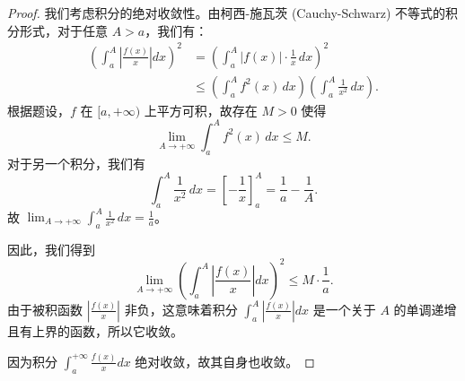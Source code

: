 \documentclass[lang=cn,10pt,thmcnt=section]{elegantbook}
\begin{document}
\begin{proof}
    我们考虑积分的绝对收敛性。由柯西-施瓦茨 (Cauchy-Schwarz) 不等式的积分形式，对于任意 $A > a$，我们有：
\begin{align*}
    \left( \int_a^A \left| \frac{f(x)}{x} \right| dx \right)^2 &= \left( \int_a^A |f(x)| \cdot \frac{1}{x} \, dx \right)^2 \\
    &\le \left( \int_a^A f^2(x) \, dx \right) \left( \int_a^A \frac{1}{x^2} \, dx \right).
\end{align*}
    根据题设，$f$ 在 $[a, +\infty)$ 上平方可积，故存在 $M > 0$ 使得
    \[
    \lim_{A \to +\infty} \int_a^A f^2(x) \, dx \le M.
    \]
    对于另一个积分，我们有
    \[
    \int_a^A \frac{1}{x^2} \, dx = \left[ -\frac{1}{x} \right]_a^A = \frac{1}{a} - \frac{1}{A}.
    \]
    故 $\lim_{A \to +\infty} \int_a^A \frac{1}{x^2} \, dx = \frac{1}{a}$。
    
    因此，我们得到
    \[
    \lim_{A \to +\infty} \left( \int_a^A \left| \frac{f(x)}{x} \right| dx \right)^2 \le M \cdot \frac{1}{a}.
    \]
    由于被积函数 $\left| \frac{f(x)}{x} \right|$ 非负，这意味着积分 $\int_a^A \left| \frac{f(x)}{x} \right| dx$ 是一个关于 $A$ 的单调递增且有上界的函数，所以它收敛。
    
    因为积分 $\int_a^{+\infty} \frac{f(x)}{x} dx$ 绝对收敛，故其自身也收敛。
\end{proof}
\end{document}
